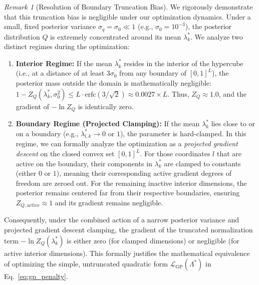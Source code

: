 \documentclass{article}
\theoremstyle{plain}
\theoremstyle{definition}
\theoremstyle{remark}
\newtheorem{remark}{Remark}
\begin{document}
\begin{remark}[Resolution of Boundary Truncation Bias]
We rigorously demonstrate that this truncation bias is negligible under our optimization dynamics. Under a small, fixed posterior variance $\sigma_q = \sigma_0 \ll 1$ (e.g., $\sigma_0 = 10^{-3}$), the posterior distribution $Q$ is extremely concentrated around its mean $\lambda_k^*$. We analyze two distinct regimes during the optimization:
\begin{enumerate}
    \item \textbf{Interior Regime:} If the mean $\lambda_k^*$ resides in the interior of the hypercube (i.e., at a distance of at least $3\sigma_0$ from any boundary of $[0, 1]^L$), the posterior mass outside the domain is mathematically negligible: $1 - Z_Q(\lambda_k^*, \sigma_0^2) \le L \cdot \text{erfc}(3/\sqrt{2}) \approx 0.0027 \times L$. Thus, $Z_Q \approx 1.0$, and the gradient of $-\ln Z_Q$ is identically zero.
    \item \textbf{Boundary Regime (Projected Clamping):} If the mean $\lambda_k^*$ lies close to or on a boundary (e.g., $\lambda_{l, k}^* \to 0$ or $1$), the parameter is hard-clamped. In this regime, we can formally analyze the optimization as a \emph{projected gradient descent} on the closed convex set $[0, 1]^L$. For those coordinates $l$ that are active on the boundary, their components in $\lambda_k^*$ are clamped to constants (either $0$ or $1$), meaning their corresponding active gradient degrees of freedom are zeroed out. For the remaining inactive interior dimensions, the posterior remains centered far from their respective boundaries, ensuring $Z_{Q, \text{active}} \approx 1$ and its gradient remains negligible.
\end{enumerate}
Consequently, under the combined action of a narrow posterior variance and projected gradient descent clamping, the gradient of the truncated normalization term $-\ln Z_Q(\lambda_k^*)$ is either zero (for clamped dimensions) or negligible (for active interior dimensions). This formally justifies the mathematical equivalence of optimizing the simple, untruncated quadratic form $\mathcal{L}_{\text{GP}}(\Lambda^*)$ in Eq.~\ref{eq:gp_penalty}.


\end{remark}
\end{document}
